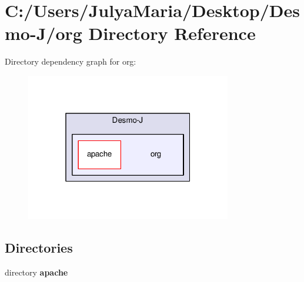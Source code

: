 \section{C\-:/\-Users/\-Julya\-Maria/\-Desktop/\-Desmo-\/\-J/org Directory Reference}
\label{dir_328f4175ef0382accc2e9fa3f4681c84}
Directory dependency graph for org\-:
\nopagebreak
\begin{figure}[H]
\begin{center}
\leavevmode
\includegraphics[width=254pt]{dir_328f4175ef0382accc2e9fa3f4681c84_dep}
\end{center}
\end{figure}
\subsection*{Directories}
\begin{DoxyCompactItemize}
\item 
directory {\bf apache}
\end{DoxyCompactItemize}
